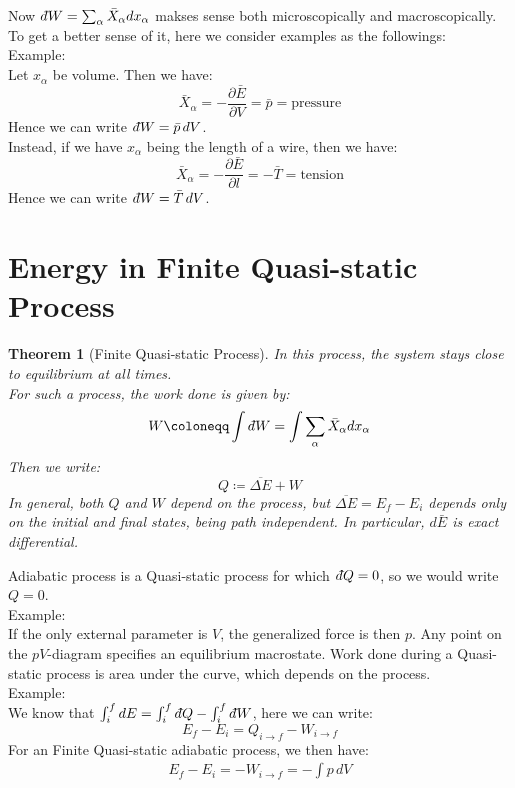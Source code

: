 \documentclass[11pt,oneside]{book}
\theoremstyle{break}
\theoremstyle{break}
\newtheorem{thm}{Theorem}[section]
\newcommand{\dbar}{d\hspace*{-0.08em}\bar{}\hspace*{0.1em}}
\newcommand{\example}{\color{green}Example: \color{black}}
\begin{document}
Now $\dbar W = \sum_{\alpha} \bar{X}_{\alpha} dx_{\alpha}$ makses sense both microscopically and macroscopically. \\
To get a better sense of it, here we consider examples as the followings:\\

\example\\
Let $x_{\alpha}$ be volume. Then we have:
$$\bar{X}_{\alpha} = -\frac{\partial \bar{E}}{\partial V} = \bar{p} = \text{pressure}$$
Hence we can write $\dbar W = \bar{p}\, dV$. \\

Instead, if we have $x_{\alpha}$ being the length of a wire, then we have:
$$\bar{X}_{\alpha} = -\frac{\partial \bar{E}}{\partial l} = -\bar{T} = \text{tension}$$
Hence we can write $\dbar W = \bar{T}\, dV$.

\newpage
\section[Energy in Finite Quasi-static Process]{\color{red} Energy in Finite Quasi-static Process\color{black}}

\begin{thm}[Finite Quasi-static Process]
In this process, the system stays close to equilibrium at all times.\\ For such a process, the work done is given by: 
$$W \coloneqq \int \dbar W = \int \sum_{\alpha} \bar{X}_{\alpha} dx_{\alpha}$$
Then we write:
$$Q \coloneqq \overline{\Delta E} + W$$
In general, both $Q$ and $W$ depend on the process, but $\overline{ \Delta E} = E_f - E_i$ depends only on the initial and final states, being path independent. In particular, $d\bar{E}$ is exact differential.
\end{thm}

Adiabatic process is a Quasi-static process for which $\dbar Q = 0$, so we would write $Q= 0 $. \\

\example\\
If the only external parameter is $V$, the generalized force is then $p$. Any point on the $pV$-diagram specifies an equilibrium macrostate. Work done during a Quasi-static process is area under the curve, which depends on the process. \\

\example\\
We know that $\int_i^f dE = \int_i^f \dbar Q - \int_i^f \dbar W$, here we can write:
$$E_f - E_i = Q_{i\to f} - W_{i\to f}$$
For an Finite Quasi-static adiabatic process, we then have:
\begin{align*}
E_f - E_i = -W_{i \to f} = -\int p\, dV
\end{align*}
\end{document}
